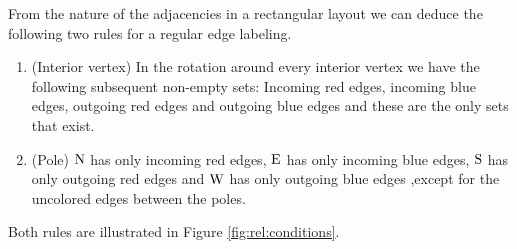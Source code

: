   From the nature of the adjacencies in a rectangular layout we can deduce the following two rules for a regular edge labeling.
  \begin{enumerate}
    \item (Interior vertex) In the rotation around every interior vertex we have the following subsequent non-empty sets: Incoming red edges, incoming blue edges, outgoing red edges and outgoing blue edges and these are the only sets that exist.
    \item (Pole) $\mathrm{N}$ has only incoming red edges, $\mathrm{E}$ has only incoming blue edges, $\mathrm{S}$ has only outgoing red edges and $\mathrm{W}$ has only outgoing blue edges ,except for the uncolored edges between the poles.
  \end{enumerate}
  Both rules are illustrated in Figure \ref{fig:rel:conditions}.

